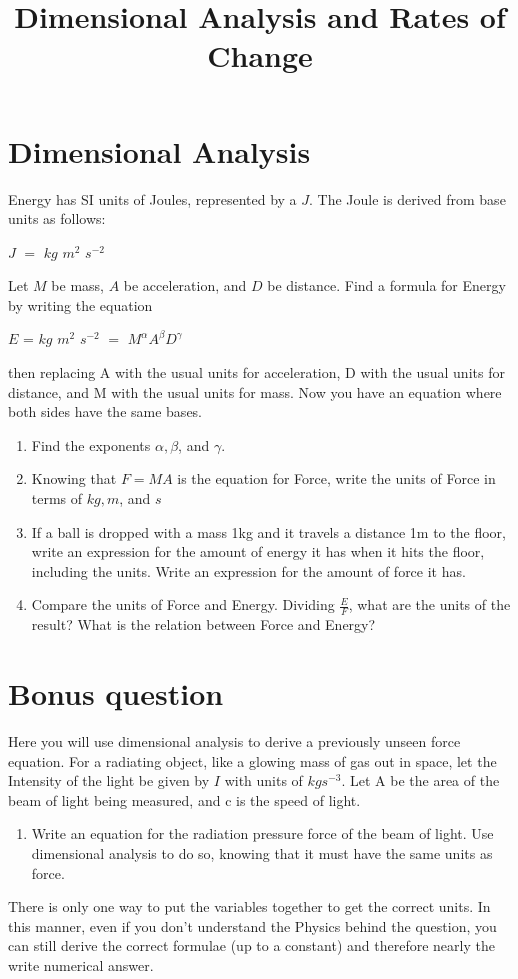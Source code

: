 \documentclass[a4paper,12pt]{article}
\begin{document}
\title {Dimensional Analysis and Rates of Change}
\maketitle
		

\section{Dimensional Analysis}

Energy has SI units of Joules, represented by a $J$. The Joule is derived from
base units as follows:

\centerline{$J$ $=$ $kg$ $m^2$ $s^{-2}$}
Let $M$ be mass, $A$ be acceleration, and $D$ be distance. Find a formula for Energy by writing the equation

\centerline{$E$ = $kg$ $m^2$ $s^{-2}$ $=$ $M^\alpha A^\beta D^\gamma$} then replacing A with the usual units for acceleration, D with the usual units for distance, and M with the usual units for mass. 
Now you have an equation where both sides have the same bases.
\begin{enumerate} 
	\item{Find the exponents $\alpha, \beta$, and $\gamma$.}
	\item{Knowing that $F=MA$ is the equation for Force, write the units of Force in terms of $kg, m$, and $s$}
	\item{If a ball is dropped with a mass 1kg and it travels a distance 1m to the floor, write an expression for the amount of energy it has when it hits the floor, including the units. Write an expression for the amount of force it has.}
	\item{Compare the units of Force and Energy. Dividing $\frac{E}{F}$, what are the units of the result? What is the relation between Force and Energy?}



\end{enumerate}

\section{Bonus question}

Here you will use dimensional analysis to derive a previously unseen force equation. For a radiating object, like a glowing mass of gas out in space, let the Intensity of the light be given by $I$ with units of $kg s^{-3}$. Let A be the area of the beam of light being measured, and c is the speed of light.
\begin{enumerate}
	\item{Write an equation for the radiation pressure force of the beam of light. Use dimensional analysis to do so, knowing that it must have the same units as force.}
\end{enumerate}
There is only one way to put the variables together to get the correct units. In this manner, even if you don't understand the Physics behind the question, you can still derive the correct formulae (up to a constant) and therefore nearly the write numerical answer. 
\end{document}
